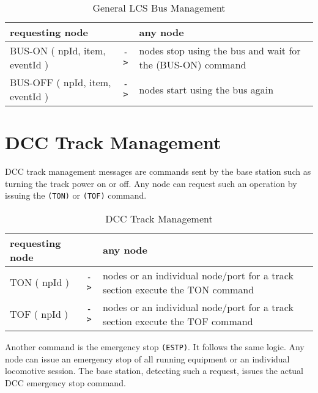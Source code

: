 \begin{table}[ht!]
    \begin{center}
        \caption{General LCS Bus Management}
        \begin{tabular}{|p{} c p{}|}
            \toprule
            \textbf{requesting node} & & \textbf{ any node} \\
            \midrule
            BUS-ON ( npId, item, eventId ) & \texttt{->} & nodes stop using the bus and wait for the (BUS-ON) command  \\
            \midrule
            BUS-OFF ( npId, item, eventId ) & \texttt{->} & nodes start using the bus again \\
            \bottomrule
        \end{tabular}
    \end{center}
\end{table}

\section{DCC Track Management}

DCC track management messages are commands sent by the base station such as turning the track power on or off. Any node can request such an operation by issuing the \texttt{(TON)} or \texttt{(TOF)} command.

\begin{table}[ht!]
    \begin{center}
        \caption{DCC Track Management}
        \begin{tabular}{|p{} c p{}|}
            \toprule
            \textbf{requesting node} & & \textbf{ any node} \\
            \midrule
            TON ( npId ) & \texttt{->} & nodes or an individual node/port for a track section execute the TON command  \\
            \midrule
            TOF ( npId ) & \texttt{->} & nodes or an individual node/port for a track section execute the TOF command \\
            \bottomrule
        \end{tabular}
    \end{center}
\end{table}

Another command is the emergency stop \texttt{(ESTP)}. It follows the same logic. Any node can issue an emergency stop of all running equipment or an individual locomotive session. The base station, detecting such a request, issues the actual DCC emergency stop command. 

